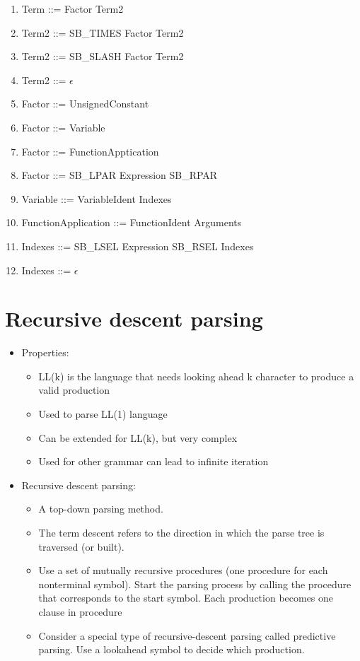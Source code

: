 \documentclass[12pt, a4paper]{report}
\begin{document}
\begin{enumerate}
					\item Term ::= Factor Term2
					\item Term2 ::= SB\_TIMES Factor Term2
					\item Term2 ::= SB\_SLASH Factor Term2
					\item Term2 ::= $\epsilon$
					\item Factor ::= UnsignedConstant
					\item Factor ::= Variable
					\item Factor ::= FunctionApptication
					\item Factor ::= SB\_LPAR Expression SB\_RPAR
					\item Variable ::= VariableIdent Indexes
					\item FunctionApplication ::= FunctionIdent Arguments
					\item Indexes ::= SB\_LSEL Expression SB\_RSEL Indexes
					\item Indexes ::= $\epsilon$
				\end{enumerate}
		\section{Recursive descent parsing}
			\begin{itemize}
				\item Properties:
				\begin{itemize}
					\item LL(k) is the language that needs looking ahead k character to produce a valid production
           			\item Used to parse LL(1) language
           			\item Can be extended for LL(k), but very complex 
           			\item Used for other grammar can lead to infinite iteration	
				\end{itemize}				 
           		\item Recursive descent parsing:
           		\begin{itemize}
     				\item A top-down parsing method.
    				\item The term descent refers to the direction in which the  parse tree is traversed (or built). 
    				\item Use a set of mutually recursive procedures (one procedure for each nonterminal symbol). Start the parsing process by calling the procedure that corresponds to the start symbol. Each production becomes one clause in procedure 
    				\item Consider a special type of recursive-descent parsing called predictive parsing. Use a lookahead symbol to decide which production.
    			\end{itemize}
			\end{itemize}
\end{document}

